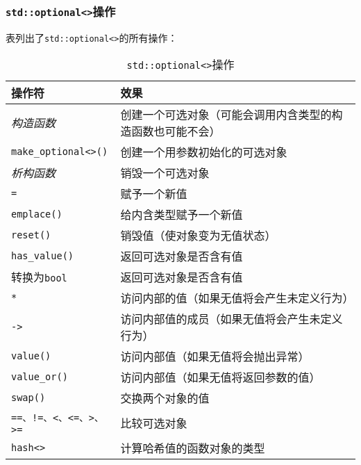 \subsubsection{\texttt{std::optional<>}操作}
表列出了\texttt{std::optional<>}的所有操作：\\
\begin{table}[ht]
    \begin{tabular}{l|p{}}
        \hline
        \textbf{操作符}                & \textbf{效果}                   \\
        \hline
        \emph{构造函数}                 & 创建一个可选对象（可能会调用内含类型的构造函数也可能不会） \\
        \texttt{make\_optional<>()} & 创建一个用参数初始化的可选对象               \\
        \emph{析构函数}                 & 销毁一个可选对象                      \\
        \texttt{=}                  & 赋予一个新值                        \\
        \texttt{emplace()}          & 给内含类型赋予一个新值                   \\
        \texttt{reset()}            & 销毁值（使对象变为无值状态）                \\
        \texttt{has\_value()}       & 返回可选对象是否含有值                   \\
        转换为\texttt{bool}            & 返回可选对象是否含有值                   \\
        \texttt{*}                  & 访问内部的值（如果无值将会产生未定义行为）         \\
        \texttt{->}                 & 访问内部值的成员（如果无值将会产生未定义行为）       \\
        \texttt{value()}            & 访问内部值（如果无值将会抛出异常）             \\
        \texttt{value\_or()}        & 访问内部值（如果无值将返回参数的值）            \\
        \texttt{swap()}             & 交换两个对象的值                      \\
        \texttt{==、!=、<、<=、>、>=}    & 比较可选对象                        \\
        \texttt{hash<>}             & 计算哈希值的函数对象的类型                 \\
        \hline
    \end{tabular}
    \caption{\texttt{std::optional<>}操作}
    \label{t15.1}
\end{table}

